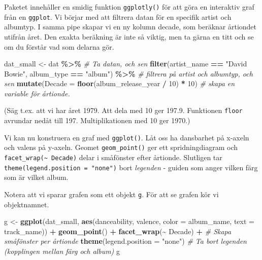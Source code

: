 \documentclass[
]{book}
\newenvironment{Shaded}{\begin{snugshade}}{\end{snugshade}}
\newcommand{\AttributeTok}[1]{\textcolor[rgb]{0.13,0.29,0.53}{#1}}
\newcommand{\CommentTok}[1]{\textcolor[rgb]{0.56,0.35,0.01}{\textit{#1}}}
\newcommand{\DecValTok}[1]{\textcolor[rgb]{0.00,0.00,0.81}{#1}}
\newcommand{\FunctionTok}[1]{\textcolor[rgb]{0.13,0.29,0.53}{\textbf{#1}}}
\newcommand{\NormalTok}[1]{#1}
\newcommand{\OtherTok}[1]{\textcolor[rgb]{0.56,0.35,0.01}{#1}}
\newcommand{\SpecialCharTok}[1]{\textcolor[rgb]{0.81,0.36,0.00}{\textbf{#1}}}
\newcommand{\StringTok}[1]{\textcolor[rgb]{0.31,0.60,0.02}{#1}}
\theoremstyle{definition}
\theoremstyle{definition}
\theoremstyle{definition}
\theoremstyle{definition}
\theoremstyle{remark}
\begin{document}
Paketet innehåller en smidig funktion \texttt{ggplotly()} för att göra en interaktiv graf från en \texttt{ggplot}. Vi börjar med att filtrera datan för en specifik artist och albumtyp. I samma pipe skapar vi en ny kolumn decade, som beräknar årtiondet utifrån året. Den exakta beräkning är inte så viktig, men ta gärna en titt och se om du förstår vad som delarna gör.

\begin{Shaded}
\begin{Highlighting}[]
\NormalTok{dat\_small }\OtherTok{\textless{}{-}}\NormalTok{ dat }\SpecialCharTok{\%\textgreater{}\%}                                                 \CommentTok{\# Ta datan, och sen}
  \FunctionTok{filter}\NormalTok{(artist\_name }\SpecialCharTok{==} \StringTok{"David Bowie"}\NormalTok{, album\_type }\SpecialCharTok{==} \StringTok{"album"}\NormalTok{) }\SpecialCharTok{\%\textgreater{}\%}    \CommentTok{\# filtrera på artist och albumtyp, och sen}
  \FunctionTok{mutate}\NormalTok{(}\AttributeTok{Decade =} \FunctionTok{floor}\NormalTok{(album\_release\_year }\SpecialCharTok{/} \DecValTok{10}\NormalTok{) }\SpecialCharTok{*} \DecValTok{10}\NormalTok{)               }\CommentTok{\# skapa en variable för årtionde.}
\end{Highlighting}
\end{Shaded}

(Säg t.ex. att vi har året 1979. Att dela med 10 ger 197.9. Funktionen \texttt{floor} avrundar nedåt till 197. Multiplikationen med 10 ger 1970.)

Vi kan nu konstruera en graf med \texttt{ggplot()}. Låt oss ha dansbarhet på x-axeln och valens på y-axeln. Geomet \texttt{geom\_point()} ger ett spridningdiagram och \texttt{facet\_wrap(\textasciitilde{}\ Decade)} delar i småfönster efter årtionde. Slutligen tar \texttt{theme(legend.position\ =\ "none")} bort \emph{legenden} - guiden som anger vilken färg som är vilket album.

Notera att vi sparar grafen som ett objekt \texttt{g}. För att se grafen kör vi objektnamnet.

\begin{Shaded}
\begin{Highlighting}[]
\NormalTok{g }\OtherTok{\textless{}{-}} \FunctionTok{ggplot}\NormalTok{(dat\_small, }\FunctionTok{aes}\NormalTok{(danceability, valence, }\AttributeTok{color =}\NormalTok{ album\_name, }\AttributeTok{text =}\NormalTok{ track\_name)) }\SpecialCharTok{+}
  \FunctionTok{geom\_point}\NormalTok{() }\SpecialCharTok{+}
  \FunctionTok{facet\_wrap}\NormalTok{(}\SpecialCharTok{\textasciitilde{}}\NormalTok{ Decade) }\SpecialCharTok{+}            \CommentTok{\# Skapa småfönster per årtionde}
  \FunctionTok{theme}\NormalTok{(}\AttributeTok{legend.position =} \StringTok{"none"}\NormalTok{)   }\CommentTok{\# Ta bort legenden (kopplingen mellan färg och album)}
\NormalTok{g}
\end{Highlighting}
\end{Shaded}
\end{document}
